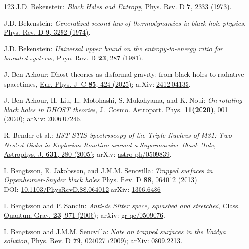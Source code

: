 \begin{thebibliography}{123}
J.D. Bekenstein:
{\em Black Holes and Entropy},
\href{https://doi.org/10.1103/PhysRevD.7.2333}{Phys. Rev. D {\bf 7}, 2333 (1973)}.

J.D. Bekenstein:
{\em Generalized second law of thermodynamics in black-hole physics},
\href{https://doi.org/10.1103/PhysRevD.9.3292}{Phys. Rev. D {\bf 9}, 3292 (1974)}.

J.D. Bekenstein:
{\em Universal upper bound on the entropy-to-energy ratio for bounded systems},
\href{https://doi.org/10.1103/PhysRevD.23.287}{Phys. Rev. D {\bf 23}, 287 (1981)}.

J. Ben Achour:
{Dhost theories as disformal gravity: from black holes to radiative spacetimes},
\href{https://doi.org/10.1140/epjc/s10052-025-13983-8}{Eur. Phys. J. C {\bf 85}, 424 (2025)};
arXiv: \href{https://arxiv.org/abs/2412.04135}{2412.04135}.

J. Ben Achour, H. Liu, H. Motohashi, S. Mukohyama, and K. Noui:
{\em On rotating black holes in DHOST theories},
\href{https://doi.org/10.1088/1475-7516/2020/11/001}{J.~Cosmo. Astropart. Phys. {\bf 11(2020)}, 001 (2020)};
arXiv: \href{https://arxiv.org/abs/2006.07245}{2006.07245}.

R. Bender et al.:
{\em HST STIS Spectroscopy of the Triple Nucleus of M31: Two Nested Disks in Keplerian Rotation around a Supermassive Black Hole},
\href{https://doi.org/10.1086/432434}{Astrophys. J. {\bf 631}, 280 (2005)};
arXiv: \href{https://arxiv.org/abs/astro-ph/0509839}{astro-ph/0509839}.

I. Bengtsson, E. Jakobsson, and J.M.M. Senovilla:
{\em Trapped surfaces in Oppenheimer-Snyder black holes}
Phys. Rev. D {\bf 88}, 064012 (2013)\\
DOI: \href{https://doi.org/10.1103/PhysRevD.88.064012}{10.1103/PhysRevD.88.064012}\hfill
arXiv: \href{https://arxiv.org/abs/1306.6486}{1306.6486}

I. Bengtsson and P. Sandin:
{\em Anti-de Sitter space, squashed and stretched},
\href{https://doi.org/10.1088/0264-9381/23/3/022}{Class. Quantum Grav. {\bf 23}, 971 (2006)};
arXiv: \href{https://arxiv.org/abs/gr-qc/0509076}{gr-qc/0509076}.

I. Bengtsson and J.M.M. Senovilla:
{\em Note on trapped surfaces in the Vaidya solution},
\href{https://doi.org/10.1103/PhysRevD.79.024027}{Phys. Rev. D {\bf 79}, 024027 (2009)};
arXiv: \href{https://arxiv.org/abs/0809.2213}{0809.2213}.


\end{thebibliography}
